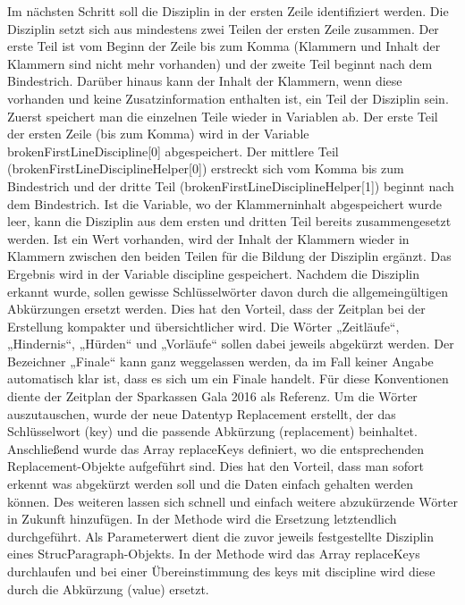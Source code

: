 {Im nächsten Schritt soll die Disziplin in der ersten Zeile identifiziert werden. Die Disziplin setzt sich aus mindestens zwei Teilen der ersten Zeile zusammen. Der erste Teil ist vom Beginn der Zeile bis zum Komma (Klammern und Inhalt der Klammern sind nicht mehr vorhanden) und der zweite Teil beginnt nach dem Bindestrich. Darüber hinaus kann der Inhalt der Klammern, wenn diese vorhanden und keine Zusatzinformation enthalten ist, ein Teil der Disziplin sein.
Zuerst speichert man die einzelnen Teile wieder in Variablen ab. Der erste Teil der ersten Zeile (bis zum Komma) wird in der Variable brokenFirstLineDiscipline[0] abgespeichert. Der mittlere Teil (brokenFirstLineDisciplineHelper[0]) erstreckt sich vom Komma bis zum Bindestrich und der dritte Teil (brokenFirstLineDisciplineHelper[1]) beginnt nach dem Bindestrich. Ist die Variable, wo der Klammerninhalt abgespeichert wurde leer, kann die Disziplin aus dem ersten und dritten Teil bereits zusammengesetzt werden. Ist ein Wert vorhanden, wird der Inhalt der Klammern wieder in Klammern zwischen den beiden Teilen für die Bildung der Disziplin ergänzt. Das Ergebnis wird in der Variable discipline gespeichert.
Nachdem die Disziplin erkannt wurde, sollen gewisse Schlüsselwörter davon durch die allgemeingültigen Abkürzungen ersetzt werden. Dies hat den Vorteil, dass der Zeitplan bei der Erstellung kompakter und übersichtlicher wird. Die Wörter „Zeitläufe“, „Hindernis“, „Hürden“ und „Vorläufe“ sollen dabei jeweils abgekürzt werden. Der Bezeichner „Finale“ kann ganz weggelassen werden, da im Fall keiner Angabe automatisch klar ist, dass es sich um ein Finale handelt. Für diese Konventionen diente der Zeitplan der Sparkassen Gala 2016 als Referenz. Um die Wörter auszutauschen, wurde der neue Datentyp Replacement erstellt, der das Schlüsselwort (key) und die passende Abkürzung (replacement) beinhaltet. Anschließend wurde das Array replaceKeys definiert, wo die entsprechenden Replacement-Objekte aufgeführt sind. Dies hat den Vorteil, dass man sofort erkennt was abgekürzt werden soll und die Daten einfach gehalten werden können. Des weiteren lassen sich schnell und einfach weitere abzukürzende Wörter in Zukunft hinzufügen. In der Methode wird die Ersetzung letztendlich durchgeführt. Als Parameterwert dient die zuvor jeweils festgestellte Disziplin eines StrucParagraph-Objekts. In der Methode wird das Array replaceKeys durchlaufen und bei einer Übereinstimmung des keys mit discipline wird diese durch die Abkürzung (value) ersetzt.

}
